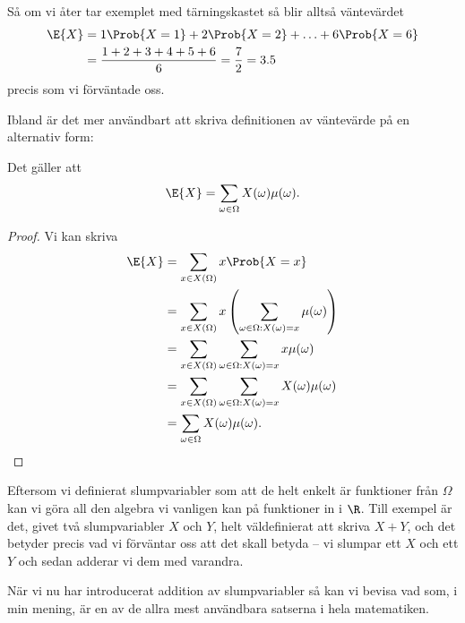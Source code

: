\documentclass[nobib]{tufte-handout}
\begin{document}
\begin{example}
    Så om vi åter tar exemplet med tärningskastet så blir alltså väntevärdet
    \begin{align*}
        \E{X} &= 1\Prob{X = 1} + 2\Prob{X = 2} + \ldots + 6\Prob{X = 6}\\
        &= \frac{1 + 2 + 3 + 4 + 5 + 6}{6} = \frac{7}{2} = 3.5
    \end{align*}
    precis som vi förväntade oss.
\end{example}

Ibland är det mer användbart att skriva definitionen av väntevärde på en alternativ form:

\begin{lemma}\label{lemma_expectation_as_sum_over_omegas}
    Det gäller att
    $$\E{X} = \sum_{\omega \in \Omega} X(\omega)\mu(\omega).$$

    \begin{proof}
        Vi kan skriva
        \begin{align*}
            \E{X} &= \sum_{x \in X(\Omega)} x \Prob{X = x}\\
            &= \sum_{x \in X(\Omega)} x\left(\sum_{\omega \in \Omega: X(\omega) = x} \mu(\omega)\right)\\
            &= \sum_{x \in X(\Omega)} \sum_{\omega \in \Omega: X(\omega) = x} x\mu(\omega)\\
            &= \sum_{x \in X(\Omega)} \sum_{\omega \in \Omega: X(\omega) = x} X(\omega)\mu(\omega)\\
            &= \sum_{\omega \in \Omega} X(\omega)\mu(\omega).
        \end{align*}
    \end{proof}
\end{lemma}

Eftersom vi definierat slumpvariabler som att de helt enkelt är funktioner från $\Omega$ kan vi göra all den algebra vi vanligen kan på funktioner in i $\R$. Till exempel är det, givet två slumpvariabler $X$ och $Y$, helt väldefinierat att skriva $X + Y$, och det betyder precis vad vi förväntar oss att det skall betyda -- vi slumpar ett $X$ och ett $Y$ och sedan adderar vi dem med varandra.

När vi nu har introducerat addition av slumpvariabler så kan vi bevisa vad som, i min mening, är en av de allra mest användbara satserna i hela matematiken.
\end{document}
